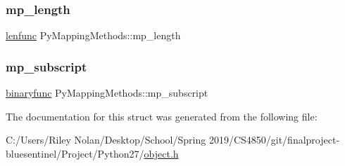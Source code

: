 \subsubsection{\texorpdfstring{mp\_length}{mp\_length}}
{\footnotesize\ttfamily \mbox{\hyperlink{_python27_2object_8h_a07099ee62617991d223a386bb7f09008}{lenfunc}} Py\+Mapping\+Methods\+::mp\+\_\+length}

\mbox{\label{struct_py_mapping_methods_acbf54a190e71b3ad665a1df1e26b1384}} 
\subsubsection{\texorpdfstring{mp\_subscript}{mp\_subscript}}
{\footnotesize\ttfamily \mbox{\hyperlink{_python27_2object_8h_a1a50b2d154f36acb9d215f2cdc1561a8}{binaryfunc}} Py\+Mapping\+Methods\+::mp\+\_\+subscript}



The documentation for this struct was generated from the following file\+:\begin{DoxyCompactItemize}
\item 
C\+:/\+Users/\+Riley Nolan/\+Desktop/\+School/\+Spring 2019/\+C\+S4850/git/finalproject-\/bluesentinel/\+Project/\+Python27/\mbox{\hyperlink{_python27_2object_8h}{object.\+h}}\end{DoxyCompactItemize}
